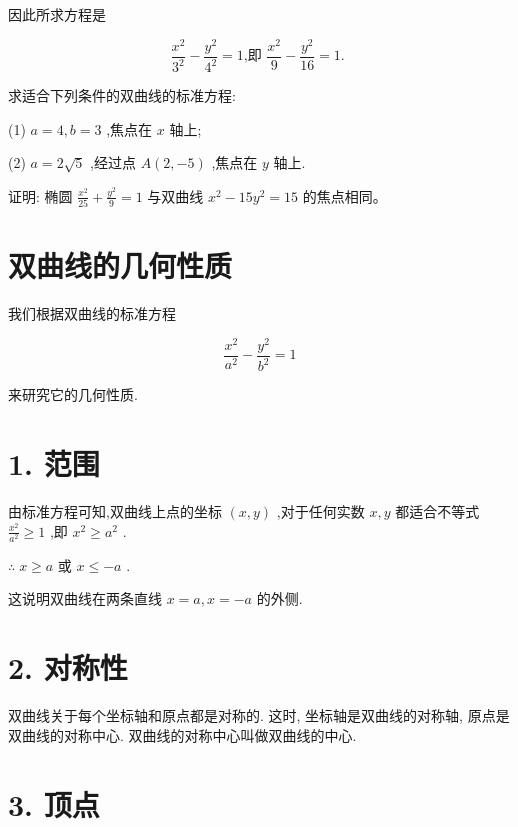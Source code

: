 \documentclass[lang=cn,newtx,10pt,scheme=chinese]{elegantbook}
\begin{document}
因此所求方程是

\[
  \frac{{x}^{2}}{{3}^{2}} - \frac{{y}^{2}}{{4}^{2}} = 1\text{,即 }\frac{{x}^{2}}{9} - \frac{{y}^{2}}{16} = 1\text{. }
\]

\begin{problemset}[练习]

\item 求适合下列条件的双曲线的标准方程:

(1) \(a = 4,b = 3\) ,焦点在 \(x\) 轴上;

(2) \(a = 2\sqrt{5}\) ,经过点 \(A\left( {2, - 5}\right)\) ,焦点在 \(y\) 轴上.

\item 证明: 椭圆 \(\frac{{x}^{2}}{25} + \frac{{y}^{2}}{9} = 1\) 与双曲线 \({x}^{2} - {15}{y}^{2} = {15}\) 的焦点相同。

\end{problemset}

\section{双曲线的几何性质}

我们根据双曲线的标准方程

\[
  \frac{{x}^{2}}{{a}^{2}} - \frac{{y}^{2}}{{b}^{2}} = 1
\]

来研究它的几何性质.

\section*{1. 范围}

由标准方程可知,双曲线上点的坐标 \(\left( {x,y}\right)\) ,对于任何实数 \(x,y\) 都适合不等式 \(\frac{{x}^{2}}{{a}^{2}} \geq 1\) ,即 \({x}^{2} \geq {a}^{2}\) .

\(\therefore \;x \geq a\) 或 \(x \leq - a\) .

这说明双曲线在两条直线 \(x = a,x = - a\) 的外侧.

\section*{2. 对称性}

双曲线关于每个坐标轴和原点都是对称的. 这时, 坐标轴是双曲线的对称轴, 原点是双曲线的对称中心. 双曲线的对称中心叫做双曲线的中心.

\section*{3. 顶点}
\end{document}
